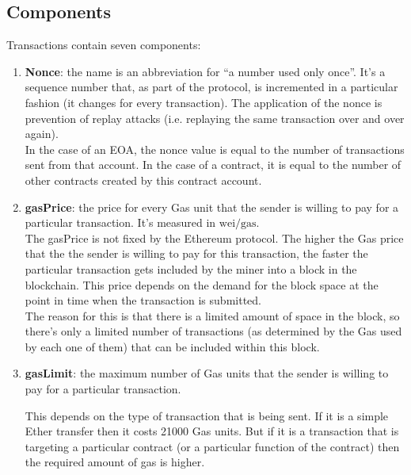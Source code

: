 \subsection*{Components}

Transactions contain seven components:

\begin{enumerate}

    \item\textbf{Nonce}: the name is an abbreviation for ``a number used only once''.
    It's a sequence number that, as part of the protocol, is incremented in a particular fashion (it changes for every transaction).
    The application of the nonce is prevention of replay attacks (i.e. replaying the same transaction over and over again).\\

    In the case of an EOA, the nonce value is equal to the number of transactions sent from that account.
    In the case of a contract, it is equal to the number of other contracts created by this contract account.
    
    \item\textbf{gasPrice}: the price for every Gas unit that the sender is willing to pay for a particular transaction.
    It's measured in $\text{wei}/\text{gas}$.\\
    
    The gasPrice is not fixed by the Ethereum protocol.
    The higher the Gas price that the the sender is willing to pay for this transaction, the faster the particular transaction gets included by the miner into a block in the blockchain.
    This price depends on the demand for the block space at the point in time when the transaction is submitted.\\

    The reason for this is that there is a limited amount of space in the block, so there's only a limited number of transactions (as determined by the Gas used by each one of them) that can be included within this block.

    \item\textbf{gasLimit}: the maximum number of Gas units that the sender is willing to pay for a particular transaction.
    
    This depends on the type of transaction that is being sent.
    If it is a simple Ether transfer then it costs 21000 Gas units.
    But if it is a transaction that is targeting a particular contract (or a particular function of the contract) then the required amount of gas is higher.\\


\end{enumerate}
